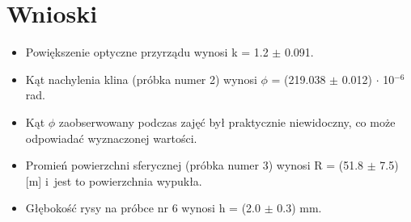 \documentclass[12pt, a4paper, oneside]{article}
\begin{document}
\section{Wnioski}
\begin{itemize}
\item Powiększenie optyczne przyrządu wynosi k = 1.2 $\pm$ 0.091.
\item Kąt nachylenia klina (próbka numer 2) wynosi $\phi$ = (219.038 $\pm$ 0.012) $\cdot$ 10$^{-6}$ rad.
\item Kąt $\phi$ zaobserwowany podczas zajęć był praktycznie niewidoczny, co może odpowiadać wyznaczonej wartości.
\item Promień powierzchni sferycznej (próbka numer 3) wynosi R = (51.8 $\pm$ 7.5) [m] i~jest to powierzchnia wypukła.
\item Głębokość rysy na próbce nr 6 wynosi h = (2.0 $\pm$ 0.3) mm.
\end{itemize}
\end{document}
